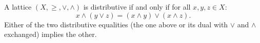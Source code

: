 A lattice $(X, \geq, \vee, \wedge)$ is distributive if and only if for all $x, y, z \in X$:
$$x \wedge (y \vee z) = (x \wedge y) \vee (x \wedge z).$$
Either of the two distributive equalities (the one above or its dual with $\vee$ and $\wedge$ exchanged) implies the other.
